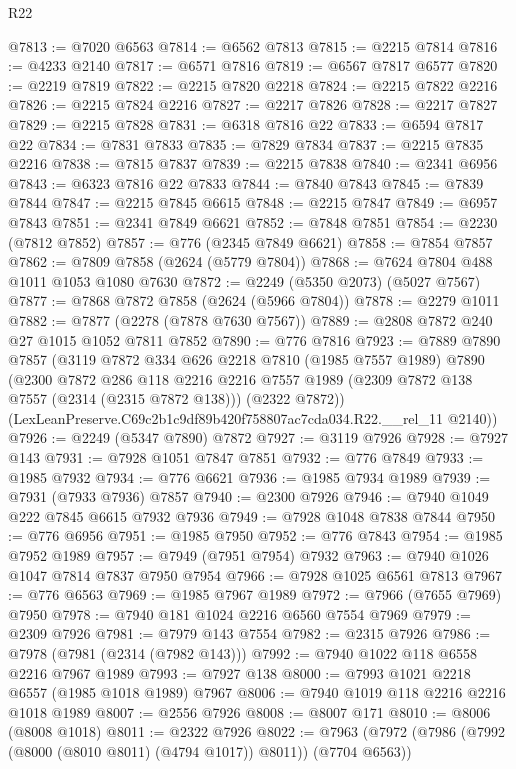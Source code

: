 \begin{lexlean}{R22}
\begin{coremodule}
@7813 := @7020 @6563
@7814 := @6562 @7813
@7815 := @2215 @7814
@7816 := @4233 @2140
@7817 := @6571 @7816
@7819 := @6567 @7817 @6577
@7820 := @2219 @7819
@7822 := @2215 @7820 @2218
@7824 := @2215 @7822 @2216
@7826 := @2215 @7824 @2216
@7827 := @2217 @7826
@7828 := @2217 @7827
@7829 := @2215 @7828
@7831 := @6318 @7816 @22
@7833 := @6594 @7817 @22
@7834 := @7831 @7833
@7835 := @7829 @7834
@7837 := @2215 @7835 @2216
@7838 := @7815 @7837
@7839 := @2215 @7838
@7840 := @2341 @6956
@7843 := @6323 @7816 @22 @7833
@7844 := @7840 @7843
@7845 := @7839 @7844
@7847 := @2215 @7845 @6615
@7848 := @2215 @7847
@7849 := @6957 @7843
@7851 := @2341 @7849 @6621
@7852 := @7848 @7851
@7854 := @2230 (@7812 @7852)
@7857 := @776 (@2345 @7849 @6621)
@7858 := @7854 @7857
@7862 := @7809 @7858 (@2624 (@5779 @7804))
@7868 := @7624 @7804 @488 @1011 @1053 @1080 @7630
@7872 := @2249 (@5350 @2073) (@5027 @7567)
@7877 := @7868 @7872 @7858 (@2624 (@5966 @7804))
@7878 := @2279 @1011
@7882 := @7877 (@2278 (@7878 @7630 @7567))
@7889 := @2808 @7872 @240 @27 @1015 @1052 @7811 @7852
@7890 := @776 @7816
@7923 := @7889
    @7890
    @7857
    (@3119
      @7872
      @334
      @626
      @2218
      @7810
      (@1985 @7557 @1989)
      @7890
      (@2300
        @7872
        @286
        @118
        @2216
        @2216
        @7557
        @1989
        (@2309 @7872 @138 @7557 (@2314 (@2315 @7872 @138)))
        (@2322 @7872))
      (LexLeanPreserve.C69c2b1c9df89b420f758807ac7cda034.R22.__rel_11 @2140))
@7926 := @2249 (@5347 @7890) @7872
@7927 := @3119 @7926
@7928 := @7927 @143
@7931 := @7928 @1051 @7847 @7851
@7932 := @776 @7849
@7933 := @1985 @7932
@7934 := @776 @6621
@7936 := @1985 @7934 @1989
@7939 := @7931 (@7933 @7936) @7857
@7940 := @2300 @7926
@7946 := @7940 @1049 @222 @7845 @6615 @7932 @7936
@7949 := @7928 @1048 @7838 @7844
@7950 := @776 @6956
@7951 := @1985 @7950
@7952 := @776 @7843
@7954 := @1985 @7952 @1989
@7957 := @7949 (@7951 @7954) @7932
@7963 := @7940 @1026 @1047 @7814 @7837 @7950 @7954
@7966 := @7928 @1025 @6561 @7813
@7967 := @776 @6563
@7969 := @1985 @7967 @1989
@7972 := @7966 (@7655 @7969) @7950
@7978 := @7940 @181 @1024 @2216 @6560 @7554 @7969
@7979 := @2309 @7926
@7981 := @7979 @143 @7554
@7982 := @2315 @7926
@7986 := @7978 (@7981 (@2314 (@7982 @143)))
@7992 := @7940 @1022 @118 @6558 @2216 @7967 @1989
@7993 := @7927 @138
@8000 := @7993 @1021 @2218 @6557 (@1985 @1018 @1989) @7967
@8006 := @7940 @1019 @118 @2216 @2216 @1018 @1989
@8007 := @2556 @7926
@8008 := @8007 @171
@8010 := @8006 (@8008 @1018)
@8011 := @2322 @7926
@8022 := @7963 (@7972 (@7986 (@7992 (@8000 (@8010 @8011) (@4794 @1017)) @8011)) (@7704 @6563))

\end{coremodule}
\end{lexlean}
